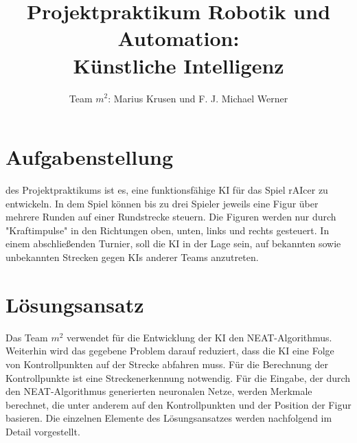 \documentclass[11pt,final,journal,a4paper,towside,towcolumn]{IEEEtran}
\begin{document}
\begin{acronym}
\end{acronym}
	
\title{Projektpraktikum Robotik und Automation:\\Künstliche Intelligenz}
\author{Team $m^2$: Marius Krusen und F. J. Michael Werner}
\maketitle

\section{Aufgabenstellung}
 des Projektpraktikums ist es, eine funktionsfähige  \ac{KI} für das Spiel rAIcer zu entwickeln. In dem Spiel können bis zu drei Spieler jeweils eine Figur über mehrere Runden auf einer Rundstrecke steuern. Die Figuren werden nur durch "Kraftimpulse" in den Richtungen oben, unten, links und rechts gesteuert. In einem abschließenden Turnier, soll die \ac{KI} in der Lage sein, auf bekannten sowie unbekannten Strecken gegen \acp{KI} anderer Teams anzutreten.

\section{Lösungsansatz}
Das Team $m^2$ verwendet für die Entwicklung der \ac{KI} den \ac{NEAT}-Algorithmus. Weiterhin wird das gegebene Problem darauf reduziert, dass die \ac{KI} eine Folge von Kontrollpunkten auf der Strecke abfahren muss. Für die Berechnung der Kontrollpunkte ist eine Streckenerkennung notwendig. Für die Eingabe, der durch den \ac{NEAT}-Algorithmus generierten neuronalen Netze, werden Merkmale berechnet, die unter anderem auf den Kontrollpunkten und der Position der Figur basieren. Die einzelnen Elemente des Lösungsansatzes werden nachfolgend im Detail vorgestellt.
\end{document}
